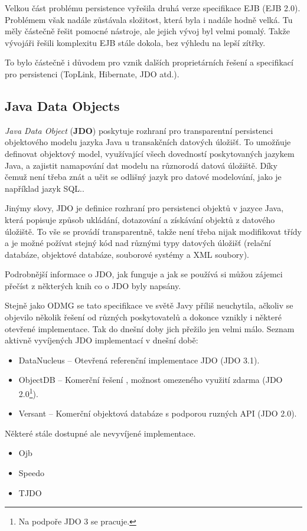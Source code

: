 Velkou část problému persistence vyřešila druhá verze specifikace EJB (EJB 2.0). Problémem však nadále zůstávala složitost, která byla i nadále hodně velká. Tu měly částečně řešit pomocné nástroje, ale jejich vývoj byl velmi pomalý. Takže vývojáři řešili komplexitu EJB stále dokola, bez výhledu na lepší zítřky.

To bylo částečně i důvodem pro vznik dalších proprietárních řešení a specifikací pro persistenci (TopLink, Hibernate, JDO atd.).

\subsection{Java Data Objects}
\emph{Java Data Object} (\textbf{JDO}) poskytuje rozhraní pro transparentní persistenci objektového modelu jazyka Java u transakčních datových úložišť. To umožňuje definovat objektový model, využívající všech dovedností poskytovaných jazykem Java, a zajistit namapování dat modelu na různorodá datová úložiště. Díky čemuž není třeba znát a učit se odlišný jazyk pro datové modelování, jako je například jazyk SQL.\cite{jordan:jdo}.

Jinýmy slovy, JDO je definice rozhraní pro persistenci objektů v jazyce Java, která popisuje způsob ukládání, dotazování a získávání objektů z datového úložiště. To vše se provádí transparentně, takže není třeba nijak modifikovat třídy a je možné požívat stejný kód nad různými typy datových úložišť (relační databáze, objektové databáze, souborové systémy a XML soubory)\cite{roos:jdo}.

Podrobnější informace o JDO, jak funguje\cite{ezzio:uujdo} a jak se používá\cite{tyagi:cjdo} si můžou zájemci přečíst z některých knih co o JDO byly napsány.

Stejně jako ODMG se tato specifikace ve světě Javy příliš neuchytila, ačkoliv se objevilo několik řešení od různých poskytovatelů a dokonce vznikly i některé otevřené implementace. Tak do dnešní doby jich přežilo jen velmi málo. Seznam aktivně vyvíjených JDO implementací v dnešní době:
\begin{itemize}
  \item DataNucleus -- Otevřená referenční implementace JDO (JDO 3.1).
  \item ObjectDB -- Komerční řešení , možnost omezeného využití zdarma (JDO 2.0\footnote{Na podpoře JDO 3 se pracuje.}).
  \item Versant -- Komerční objektová databáze s podporou ruzných API (JDO 2.0).
\end{itemize}
Některé stále dostupné ale nevyvíjené implementace.
\begin{itemize}
  \item Ojb
  \item Speedo
  \item TJDO
\end{itemize}

